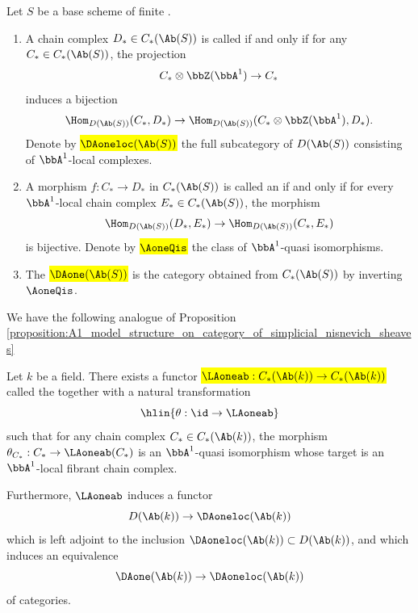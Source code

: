 \begin{definition}
    Let $S$ be a  base scheme of finite .
    \begin{enumerate}
        \item A chain complex $D_* \in C_*(\Ab(S))$ is called  if and only if for any $C_* \in C_*(\Ab(S))$, the projection 
        $$C_* \otimes \bbZ(\bbA^1) \to C_*$$
        induces a bijection
        $$\Hom_{D(\Ab(S))}(C_*, D_*) \to \Hom_{D(\Ab(S))}(C_* \otimes \bbZ(\bbA^1), D_*).$$
        Denote by \hl{$\DAoneloc(\Ab(S))$} the full subcategory of $D(\Ab(S))$ consisting of $\bbA^1$-local complexes.

        \item A morphism $f: C_* \to D_*$ in $C_*(\Ab(S))$ is called an  if and only if for every $\bbA^1$-local chain complex $E_* \in C_*(\Ab(S))$, the morphism
        $$\Hom_{D(\Ab(S))}(D_*, E_*) \to \Hom_{D(\Ab(S))}(C_*, E_*)$$
        is bijective. Denote by \hl{$\AoneQis$} the class of $\bbA^1$-quasi isomorphisms.

        \item The  \hl{$\DAone(\Ab(S))$} is the category obtained from $C_*(\Ab(S))$ by inverting $\AoneQis$.
    \end{enumerate}
\end{definition}

We have the following analogue of Proposition \ref{proposition:A1_model_structure_on_category_of_simplicial_nisnevich_sheaves}

\begin{theorem}
    Let $k$ be a field. There exists a functor \hl{$\LAoneab: C_*(\Ab(k)) \to C_*(\Ab(k))$} called the  together with a natural transformation
    $$\hlin{\theta: \id \to \LAoneab}$$
    such that for any chain complex $C_* \in C_*(\Ab(k))$, the morphism $\theta_{C_*}: C_* \to \LAoneab(C_*)$ is an $\bbA^1$-quasi isomorphism whose target is an $\bbA^1$-local fibrant chain complex.

    Furthermore, $\LAoneab$ induces a functor
    $$D(\Ab(k)) \to \DAoneloc(\Ab(k))$$
    which is left adjoint to the inclusion $\DAoneloc(\Ab(k)) \subset D(\Ab(k))$, and which induces an equivalence
    $$\DAone(\Ab(k)) \to \DAoneloc(\Ab(k))$$
    of categories.
\end{theorem}

